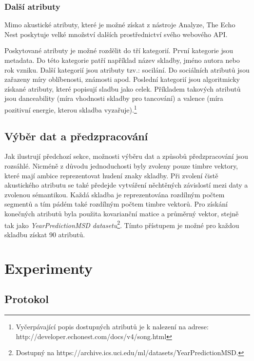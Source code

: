 \documentclass[thesis=M,czech]{FITthesis}[2012/06/26]
\begin{document}
\subsection{Další atributy}
Mimo akustické atributy, které je možné získat z nástroje Analyze, The Echo Nest poskytuje velké množství dalších prostřednictví svého webového API.

Poskytované atributy je možné rozdělit do tří kategorií. První kategorie jsou metadata. Do této kategorie patří například název skladby, jméno autora nebo rok vzniku. Další kategorií jsou atributy tzv.: socilání. Do sociálních atributů jsou zařazeny míry oblíbenosti, známosti apod. Poslední kategorií jsou algoritmicky získané atributy, které popisují sladbu jako celek. Příkladem takových atributů jsou danceability (míra vhodnosti skladby pro tancování) a valence (míra pozitivní energie, kterou skladba vyzařuje).\footnote{Vyčerpávající popis dostupných atributů je k nalezení na adrese: http://developer.echonest.com/docs/v4/song.html}

\section{Výběr dat a předzpracování}
Jak ilustrují předchozí sekce, možnosti výběru dat a způsobů předzpracování jsou rozsáhlé. Nicméně z důvodu jednoduchosti byly zvoleny pouze timbre vektory, které mají ambice reprezentovat hudení znaky skladby. Při zvolení čistě akustického atributu se také předejde vytváření něchtěných závislostí mezi daty a zvolenou sémantikou. Každá skladba je reprezentována rozdílným počtem segmentů a tím pádém také rozdílným počtem timbre vektorů. Pro získání konečných atributů byla použita kovarianční matice a průměrný vektor, stejně tak jako \textit{YearPredictionMSD datasetu}\footnote{Dostupný na https://archive.ics.uci.edu/ml/datasets/YearPredictionMSD.}. Tímto přístupem je možné pro každou skladbu získat $90$ atributů.





\chapter{Experimenty}
\section{Protokol}
\end{document}
